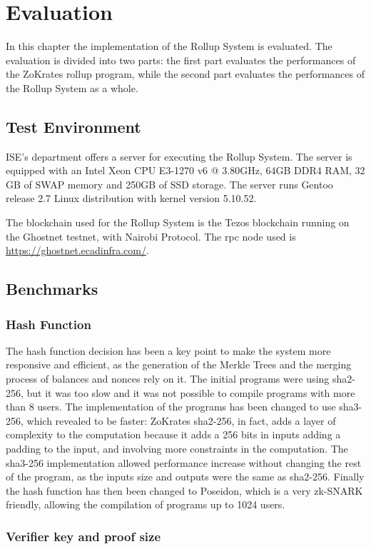 \chapter{Evaluation\label{cha:chapter6}}

In this chapter the implementation of the Rollup System is evaluated. The evaluation is divided into two parts: the first part evaluates the performances of the ZoKrates rollup program, while the second part evaluates the performances of the Rollup System as a whole.



\section{Test Environment\label{sec:testenvir}}

ISE's department offers a server for executing the Rollup System. The server is equipped with an Intel Xeon CPU E3-1270 v6 @ 3.80GHz, 64GB DDR4 RAM, 32 GB of SWAP memory and 250GB of SSD storage. The server runs Gentoo release 2.7 Linux distribution with kernel version 5.10.52.

The blockchain used for the Rollup System is the Tezos blockchain running on the Ghostnet testnet, with Nairobi Protocol. The rpc node used is \url{https://ghostnet.ecadinfra.com/}.


\section{Benchmarks\label{sec:benchmarks}}

\subsection{Hash Function\label{subsec:6_hashfunc}}

The hash function decision has been a key point to make the system more responsive and efficient, as the generation of the Merkle Trees and the merging process of balances and nonces rely on it. The initial programs were using sha2-256, but it was too slow and it was not possible to compile programs with more than 8 users. The implementation of the programs has been changed to use sha3-256, which revealed to be faster: ZoKrates sha2-256, in fact, adds a layer of complexity to the computation because it adds a 256 bits in inputs adding a padding to the input, and involving more constraints in the computation. The sha3-256 implementation allowed performance increase without changing the rest of the program, as the inputs size and outputs were the same as sha2-256.
Finally the hash function has then been changed to Poseidon, which is a very zk-SNARK friendly, allowing the compilation of programs up to 1024 users.



\subsection{Verifier key and proof size\label{subsec:6_verifierproofsize}}
